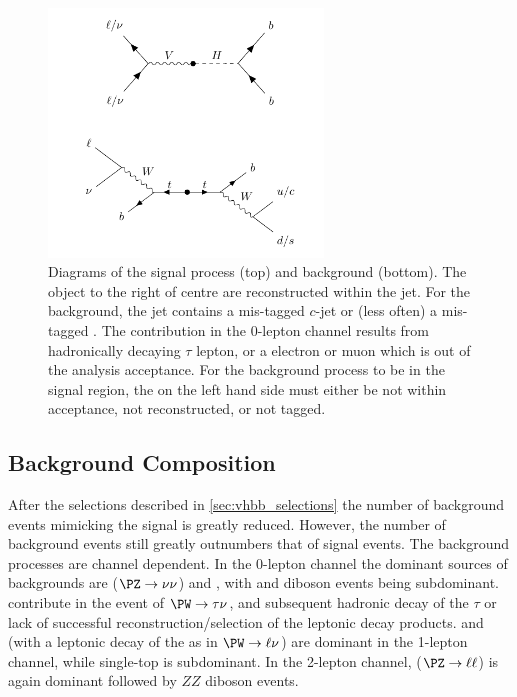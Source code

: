%
\begin{figure}[!htbp]
  \centering
  \includegraphics[width=0.65\textwidth]{chapters/6.vhbb_boosted/figs/sr_cr_diagrams.pdf}
  \caption{
    Diagrams of the signal process (top) and \ttbar background (bottom).
    The object to the right of centre are reconstructed within the \largeR jet.
    For the \ttbar background, the \largeR jet contains a mis-tagged $c$-jet or (less often) a mis-tagged \ljet.
    The contribution in the 0-lepton channel results from hadronically decaying $\tau$ lepton, or a electron or muon which is out of the analysis acceptance.
    For the \ttbar background process to be in the signal region, the \bjet on the left hand side must either be not within acceptance, not reconstructed, or not tagged.
  }
  \label{fig:sr_cr_diagrams}
\end{figure}
%

\subsection{Background Composition}\label{sec:vebb_background_composition}

After the selections described in \cref{sec:vhbb_selections} the number of background events mimicking the \VHbb signal is greatly reduced.
However, the number of background events still greatly outnumbers that of signal events.
The background processes are channel dependent.
In the 0-lepton channel the dominant sources of backgrounds are \Zjets ($\Zboson \to \nu\nu$) and \ttbar, with \Wjets and diboson events being subdominant.
\Wjets contribute in the event of $\Wboson \to \tau\nu$, and subsequent hadronic decay of the $\tau$ or lack of successful reconstruction/selection of the leptonic decay products.
\ttbar and \Wjets (with a leptonic decay of the \Wboson as in $\Wboson \to \ell\nu$) are dominant in the 1-lepton channel, while single-top is subdominant.
In the 2-lepton channel, \Zjets ($\Zboson \to \ell\ell$) is again dominant followed by $ZZ$ diboson events.

